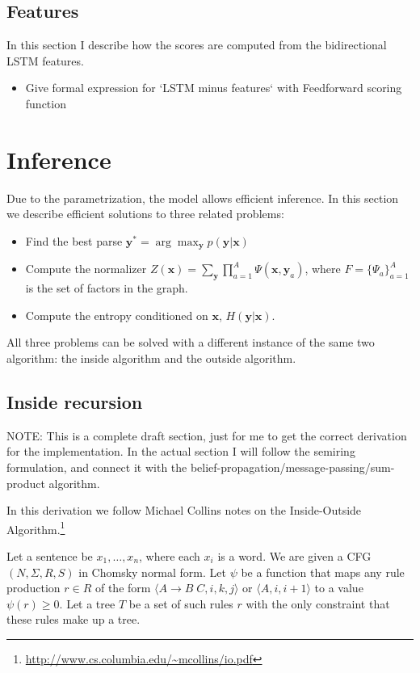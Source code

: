 \subsection{Features}
In this section I describe how the scores are computed from the bidirectional LSTM features.
\begin{itemize}
  \item Give formal expression for `LSTM minus features` with Feedforward scoring function
\end{itemize}

\section{Inference}
Due to the parametrization, the model allows efficient inference. In this section we describe efficient solutions to three related problems:
\begin{itemize}
  \item Find the best parse $\mathbf{y}^{*} = \arg \max_{\mathbf{y}} p(\mathbf{y} | \mathbf{x})$
  \item Compute the normalizer $Z(\mathbf{x}) = \sum_{ \mathbf{y} } \prod_{ a=1 }^{ A } \Psi( \mathbf{x}, \mathbf{y}_a )$, where $F = \{ \Psi_a \}_{a=1}^{A}$ is the set of factors in the graph.
  \item Compute the entropy conditioned on $\mathbf{x}$, $H(\mathbf{y} | \mathbf{x})$.
\end{itemize}
All three problems can be solved with a different instance of the same two algorithm: the inside algorithm and the outside algorithm.


\subsection{Inside recursion}
NOTE: This is a complete draft section, just for me to get the correct derivation for the implementation. In the actual section I will follow the semiring formulation, and connect it with the belief-propagation/message-passing/sum-product algorithm.

In this derivation we follow Michael Collins notes on the Inside-Outside Algorithm.\footnote{\url{http://www.cs.columbia.edu/~mcollins/io.pdf}}

Let a sentence be $x_1,\dots,x_n$, where each $x_i$
is a word. We are given a CFG $(N, \Sigma, R, S)$ in Chomsky normal
form. Let $\psi$ be a function that maps any rule production $r \in R$ of the form $\langle A \to B \;C, i, k, j \rangle$ or $\langle A, i, i+1 \rangle$ to a value $\psi(r) \geq 0$. Let a tree $T$ be a set of such rules $r$ with the only constraint that these rules make up a tree.

